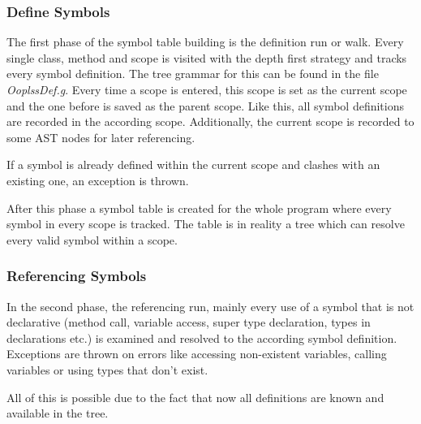 \subsubsection{Define Symbols}
The first phase of the symbol table building is the definition run or
walk.  Every single class, method and scope is visited with the depth
first strategy and tracks every symbol definition. The tree grammar for
this can be found in the file \emph{OoplssDef.g}. Every time a scope
is entered, this scope is set as the current scope and the one before
is saved as the parent scope.  Like this, all symbol definitions are
recorded in the according scope.  Additionally, the current scope is
recorded to some AST nodes for later referencing.

If a symbol is already defined within the current scope and clashes with
an existing one, an exception is thrown.

After this phase a symbol table is created for the whole program where
every symbol in every scope is tracked. The table is in reality a tree
which can resolve every valid symbol within a scope.


\subsubsection{Referencing Symbols}
In the second phase, the referencing run, mainly every use of a symbol that is 
not declarative (method call, variable access, super type declaration, types 
in declarations etc.) is examined and resolved to the according symbol definition. 
Exceptions are thrown on errors like accessing non-existent variables, calling 
variables or using types that don't exist.

All of this is possible due to the fact that now all definitions are known and available
in the tree.

